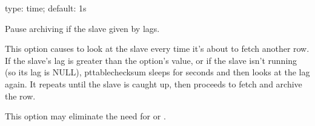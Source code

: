 \documentclass[letterpaper,10pt,english]{sphinxmanual}
\begin{document}
\begin{fulllineitems}
\label{\detokenize{mariadb-archiver:cmdoption-mariadb-archiver-max-lag}}
type: time; default: 1s

Pause archiving if the slave given by {\hyperref[\detokenize{mariadb-archiver:cmdoption-mariadb-archiver-check-slave-lag}]{}} lags.

This option causes  to look at the slave every time it’s about
to fetch another row.  If the slave’s lag is greater than the option’s value,
or if the slave isn’t running (so its lag is NULL), pt\sphinxhyphen{}table\sphinxhyphen{}checksum sleeps
for {\hyperref[\detokenize{mariadb-archiver:cmdoption-mariadb-archiver-check-interval}]{}} seconds and then looks at the lag again.  It repeats
until the slave is caught up, then proceeds to fetch and archive the row.

This option may eliminate the need for {\hyperref[\detokenize{mariadb-archiver:cmdoption-mariadb-archiver-sleep}]{}} or {\hyperref[\detokenize{mariadb-archiver:cmdoption-mariadb-archiver-sleep-coef}]{}}.

\end{fulllineitems}

\end{document}
